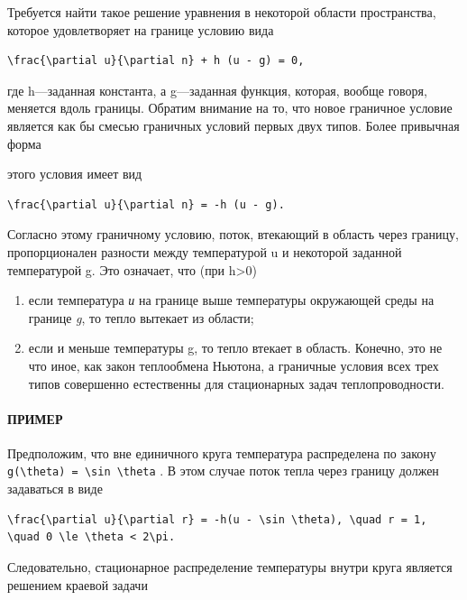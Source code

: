 \documentclass[
  ukrainian,
]{article}
\begin{document}
Требуется найти такое решение уравнения в некоторой области
пространства, которое удовлетворяет на границе условию вида

\begin{verbatim}
\frac{\partial u}{\partial n} + h (u - g) = 0,
\end{verbatim}

где h---заданная константа, а g---заданная функция, которая, вообще
говоря, меняется вдоль границы. Обратим внимание на то, что новое
граничное условие является как бы смесью граничных условий первых двух
типов. Более привычная форма

этого условия имеет вид

\begin{verbatim}
\frac{\partial u}{\partial n} = -h (u - g).
\end{verbatim}

Согласно этому граничному условию, поток, втекающий в область через
границу, пропорционален разности между температурой u и некоторой
заданной температурой g. Это означает, что (при h\textgreater0)

\begin{enumerate}
\def\labelenumi{\arabic{enumi})}
\item
  если температура \emph{и} на границе выше температуры окружающей среды
  на границе \emph{g}, то тепло вытекает из области;
\item
  если и меньше температуры g, то тепло втекает в область. Конечно, это
  не что иное, как закон теплообмена Ньютона, а граничные условия всех
  трех типов совершенно естественны для стационарных задач
  теплопроводности.
\end{enumerate}

\paragraph{ПРИМЕР}\label{ux43fux440ux438ux43cux435ux440}

Предположим, что вне единичного круга температура распределена по закону
\texttt{g(\textbackslash{}theta)\ =\ \textbackslash{}sin\ \textbackslash{}theta}
. В этом случае поток тепла через границу должен задаваться в виде

\begin{verbatim}
\frac{\partial u}{\partial r} = -h(u - \sin \theta), \quad r = 1, \quad 0 \le \theta < 2\pi.
\end{verbatim}

Следовательно, стационарное распределение температуры внутри круга
является решением краевой задачи
\end{document}

